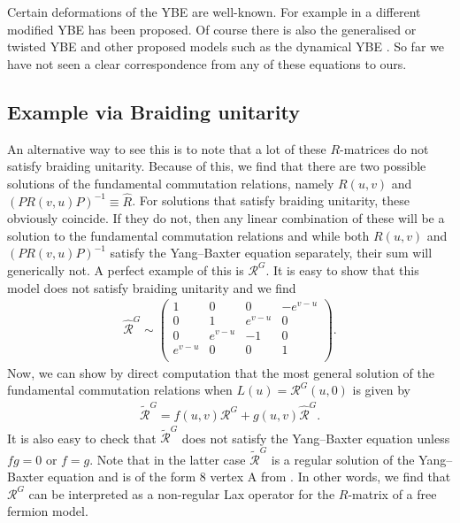 \documentclass{article}
\begin{document}
Certain deformations of the YBE are well-known. For example in \cite{gerstenhaber1997boundarysolutionsquantumyangbaxter} a different modified YBE has been proposed. Of course there is also the generalised or twisted YBE \cite{KASHAEV_1993} \cite{tarasov1994solutionstwistedyangbaxterequation} and other proposed models such as the dynamical YBE \cite{Etingof_1998}. So far we have not seen a clear correspondence from any of these equations to ours.

\subsection{Example via Braiding unitarity}

An alternative way to see this is to note that a lot of these $R$-matrices do not satisfy braiding unitarity. Because of this, we find that there are two possible solutions of the fundamental commutation relations, namely $R(u,v)$ and $(PR(v,u)P)^{-1} \equiv \hat{R}$. For solutions that satisfy braiding unitarity, these obviously coincide. If they do not, then any linear combination of these will be a solution to the fundamental commutation relations and while both $R(u,v)$ and $(PR(v,u)P)^{-1}$ satisfy the Yang--Baxter equation separately, their sum will generically not. A perfect example of this is $\mathcal{R}^G$. It is easy to show that this model does not satisfy braiding unitarity and we find
%
\begin{align}
\hat{\mathcal{R}}^G \sim 
\begin{pmatrix}
 1 & 0 & 0 & -e^{v-u} \\
 0 & 1 & e^{v-u} & 0 \\
 0 & e^{v-u} & -1 & 0 \\
 e^{v-u} & 0 & 0 & 1 \\
\end{pmatrix}.
\end{align}
%
Now, we can show by direct computation that the most general solution of the fundamental commutation relations when $L(u) = \mathcal{R}^G(u,0)$ is given by
%
\begin{align}\label{eq:RtildeG}
\tilde{\mathcal{R}}^G = f(u,v) \mathcal{R}^G  + g(u,v) \hat{\mathcal{R}}^G .
\end{align}
%
It is also easy to check that $\tilde{\mathcal{R}}^G$ does not satisfy the Yang--Baxter equation unless $fg=0$ or $f=g$. Note that in the latter case $\tilde{\mathcal{R}}^G$ is a regular solution of the Yang--Baxter equation and is of the form 8 vertex A from \cite{deLeeuw:2020ahe}. In other words, we find that $\mathcal{R}^G$ can be interpreted as a non-regular Lax operator for the $R$-matrix of a free fermion model. 
\end{document}

